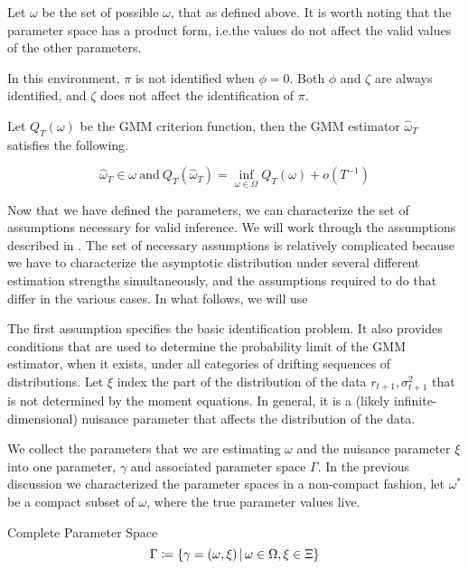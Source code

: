 \documentclass[11pt, letterpaper, twoside, final]{article}
\begin{document}
Let $\omega$ be the set of possible $\omega$, that as defined above.
It is worth noting that the parameter space has a product form, i.e.\@ the values do not affect the valid values
of the other parameters.

In this environment, $\pi$ is not identified when $\phi = 0$.
Both $\phi$ and $\zeta$ are always identified, and $\zeta$ does not affect the identification of $\pi$.

Let $Q_T(\omega)$ be the GMM criterion function, then the GMM estimator $\hat{\omega}_T$ satisfies the following.


\begin{equation}
    \widehat{\omega}_T \in \omega\ \text{and}\ Q_T(\hat{\omega}_T) = \inf_{\omega \in \Omega} Q_T(\omega) +
    o\left(T^{-1}\right) 
\end{equation}


Now that we have defined the parameters, we can characterize the set of assumptions necessary for valid inference.
We will work through the assumptions described in \textcite{andrews2014Gmm}.
The set of necessary assumptions is relatively complicated because we have to characterize the asymptotic
distribution under several different estimation strengths simultaneously, and the assumptions required to do that
  differ in the various cases. 
In what follows, we will use 

The first assumption specifies the basic identification
problem. It also provides conditions that are used to determine the
probability limit of the GMM estimator, when it exists, under all categories
of drifting sequences of distributions.
Let $\xi$ index the part of the distribution of the data $r_{t+1}, \sigma^2_{t+1}$ that is not determined by the
moment equations.
In general, it is a (likely infinite-dimensional) nuisance parameter that affects the distribution of the data. 


We collect the parameters that we are estimating $\omega$ and the nuisance parameter $\xi$ into one parameter,
$\gamma$ and associated parameter space $\Gamma$.
In the previous discussion we characterized the parameter spaces in a non-compact fashion, let $\omega^{*}$ be a
compact subset of $\omega$, where the true parameter values live.

\begin{defn}{Complete Parameter Space}
    \begin{equation}
        \Gamma \coloneqq \left\lbrace \gamma = (\omega, \xi) \,\middle\vert\, \omega \in \Omega, \xi \in \Xi \right\rbrace 
    \end{equation}
\end{defn}
\end{document}
